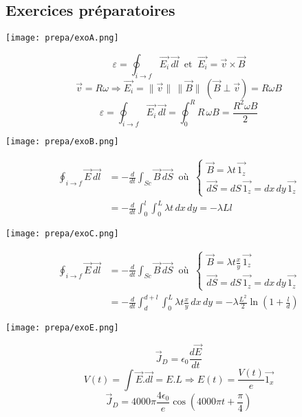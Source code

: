 \documentclass[british,french,11pt, a4paper, openany]{book}
\begin{document}
		
		
		
		\subsection{Exercices préparatoires}
		\begin{center}
			\texttt{[image: prepa/exoA.png]}\\
		\end{center}
		$$\varepsilon=\oint_{i\rightarrow f}\vec{E_i}\,\vec{dl}\ \text{  et  }\  \vec{E_i}=\vec v\times\vec B$$
		$$\vec v=R\omega\Rightarrow \vec{E_i}=\|\vec v\|\,\|\vec B\|\  (\vec{B} \perp \vec{v})=R\omega B$$
		$$\varepsilon=\oint_{i\rightarrow f}\vec{E_i}\,\vec{dl}=\oint_0^RR\,\omega B=\frac{R^2\omega B}{2}$$
		\begin{center}
			\texttt{[image: prepa/exoB.png]}\\
		\end{center}
		\begin{align*}\oint_{i\rightarrow f}\vec{E}\,\vec{dl} & =-\frac{d}{dt}\int_{Sc}\vec B\,\vec{dS}\ \text{ où }\ \left\{\begin{array}{l}
			\vec B=\lambda t\,\vec{1_z}\\
			\vec{dS}=dS\,\vec{1_z}=dx\,dy\,\vec{1_z}\end{array}\right.\\
			& =-\frac{d}{dt}\int_0^l\int_0^L\lambda t\,dx\,dy=-\lambda L l\end{align*}
			
			\newpage
			\begin{center}
			\texttt{[image: prepa/exoC.png]}\\
			\end{center}
			\begin{align*}\oint_{i\rightarrow f}\vec{E}\,\vec{dl} & =-\frac{d}{dt}\int_{Sc}\vec B\,\vec{dS}\ \text{ où }\ \left\{\begin{array}{l}
			\vec B=\lambda t\frac{x}{y}\,\vec{1_z}\\
			\vec{dS}=dS\,\vec{1_z}=dx\,dy\,\vec{1_z}\end{array}\right.\\
			& =-\frac{d}{dt}\int_d^{d+l}\int_0^L\lambda t\frac{x}{y}\,dx\,dy=-\lambda\frac{L^2}{2}\ln\left(1+\frac{l}{d}\right)\end{align*}
			
			
			\begin{center}
			\texttt{[image: prepa/exoE.png]}\\
			\end{center}
			$$\vec{J}_D = \epsilon_0 \frac{d\vec{E}}{dt}$$
			$$V(t) = \int \vec{E}.\vec{dl} = E.L \Rightarrow E(t) = \frac{V(t)}{e}\vec{1_x}$$
			$$\vec{J}_D = 4000\pi \frac{4 \epsilon_0}{e} \cos\left(4000\pi t + \frac{\pi}{4}\right)$$
			
\end{document}
